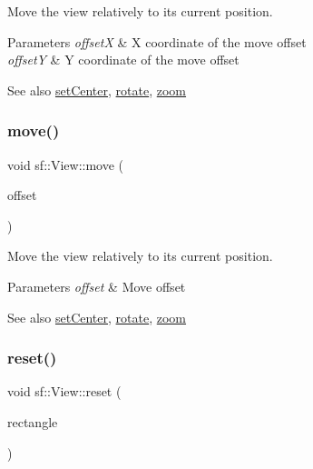 Move the view relatively to its current position. 


\begin{DoxyParams}{Parameters}
{\em offsetX} & X coordinate of the move offset \\
\hline
{\em offsetY} & Y coordinate of the move offset\\
\hline
\end{DoxyParams}
\begin{DoxySeeAlso}{See also}
\hyperlink{classsf_1_1_view_aa8e3fedb008306ff9811163545fb75f2}{set\+Center}, \hyperlink{classsf_1_1_view_a5fd3901aae1845586ca40add94faa378}{rotate}, \hyperlink{classsf_1_1_view_a4a72a360a5792fbe4e99cd6feaf7726e}{zoom} 
\end{DoxySeeAlso}
\mbox{\label{classsf_1_1_view_a4c98a6e04fed756dfaff8f629de50862}} 
\subsubsection{\texorpdfstring{move()}{move()}\hspace{0.1cm}{\footnotesize\ttfamily [2/2]}}
{\footnotesize\ttfamily void sf\+::\+View\+::move (\begin{DoxyParamCaption}\item[{const \hyperlink{classsf_1_1_vector2}{Vector2f} \&}]{offset }\end{DoxyParamCaption})}



Move the view relatively to its current position. 


\begin{DoxyParams}{Parameters}
{\em offset} & Move offset\\
\hline
\end{DoxyParams}
\begin{DoxySeeAlso}{See also}
\hyperlink{classsf_1_1_view_aa8e3fedb008306ff9811163545fb75f2}{set\+Center}, \hyperlink{classsf_1_1_view_a5fd3901aae1845586ca40add94faa378}{rotate}, \hyperlink{classsf_1_1_view_a4a72a360a5792fbe4e99cd6feaf7726e}{zoom} 
\end{DoxySeeAlso}
\mbox{\label{classsf_1_1_view_ac95b636eafab3922b7e8304fb6c00d7d}} 
\subsubsection{\texorpdfstring{reset()}{reset()}}
{\footnotesize\ttfamily void sf\+::\+View\+::reset (\begin{DoxyParamCaption}\item[{const \hyperlink{classsf_1_1_rect}{Float\+Rect} \&}]{rectangle }\end{DoxyParamCaption})}



